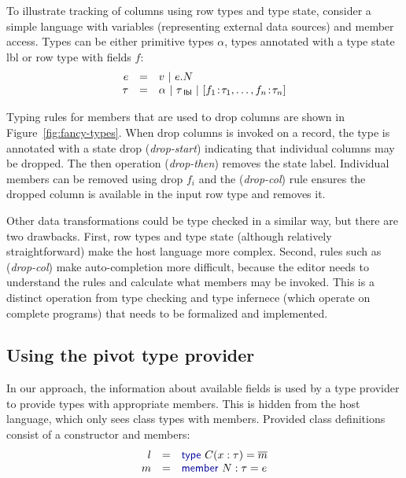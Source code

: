 \documentclass[a4paper,UKenglish]{lipics-v2016}
\theoremstyle{plain}
\theoremstyle{definition}
\newcommand{\lsep}{~|~}
\newcommand{\kvd}[1]{\textnormal{\textcolor{kvdclr}{\sffamily #1}}}
\newcommand{\ident}[1]{\textnormal{\sffamily #1}}
\newcommand{\qident}[1]{\textnormal{\sffamily \guillemotleft #1\guillemotright}}
\begin{document}
To illustrate tracking of columns using row types and type state, consider a simple language with
variables (representing external data sources) and member access. Types can be either primitive 
types $\alpha$, types annotated with a type state \ident{lbl} or row type with fields $f$:
%
\begin{equation*}
\begin{array}{rcl}  
e&=&v \lsep e.N\\
\tau&=&\alpha \lsep \tau_\ident{lbl} \lsep [f_1\!:\!\tau_1, \ldots, f_n\!:\!\tau_n] 
\end{array}  
\end{equation*}

\noindent
Typing rules for members that are used to drop columns are shown in Figure~\ref{fig:fancy-types}.
When \qident{drop columns} is invoked on a record, the type is annotated with a state \ident{drop}
(\emph{drop-start}) indicating that individual columns may be dropped. The \ident{then} 
operation (\emph{drop-then}) removes the state label. Individual members can be removed using
\qident{drop $f_i$} and the (\emph{drop-col}) rule ensures the dropped column is available in the
input row type and removes it.

Other data transformations could be type checked in a similar way, but there are two drawbacks.
First, row types and type state (although relatively straightforward) make the host language more
complex. Second, rules such as (\emph{drop-col}) make auto-completion more difficult, because the
editor needs to understand the rules and calculate what members may be invoked. This is a distinct
operation from type checking and type infernece (which operate on complete programs) that needs 
to be formalized and implemented.


\subsection{Using the pivot type provider}
\label{sec:columns-tp}

In our approach, the information about available fields is used by a type provider to provide
types with appropriate members. This is hidden from the host language, which only sees class types
with members. Provided class definitions consist of a constructor and members: 
%
\begin{equation*}
\begin{array}{rcl}
 l &=& \kvd{type}~C(x:\tau) = \overline{m} \\
 m &=& \kvd{member}~N:\tau= e
\end{array}
\end{equation*}
\end{document}
